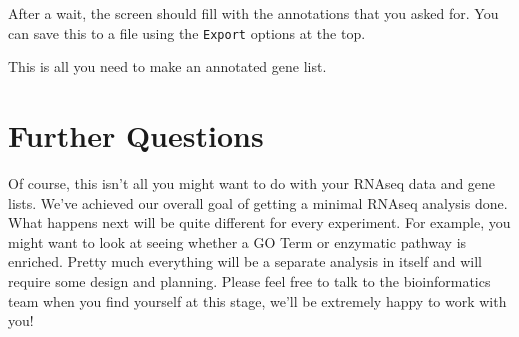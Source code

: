 \documentclass[]{book}
\begin{document}
After a wait, the screen should fill with the annotations that you asked for. You can save this to a file using the \texttt{Export} options at the top.

This is all you need to make an annotated gene list.

\hypertarget{further-questions}{%
\section{Further Questions}\label{further-questions}}

Of course, this isn't all you might want to do with your RNAseq data and gene lists. We've achieved our overall goal of getting a minimal RNAseq analysis done. What happens next will be quite different for every experiment. For example, you might want to look at seeing whether a GO Term or enzymatic pathway is enriched. Pretty much everything will be a separate analysis in itself and will require some design and planning. Please feel free to talk to the bioinformatics team when you find yourself at this stage, we'll be extremely happy to work with you!


\end{document}
